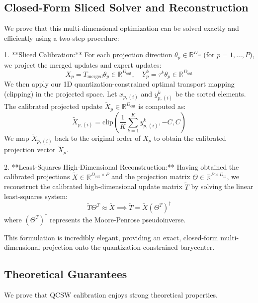 \documentclass{article}
\theoremstyle{plain}
\theoremstyle{definition}
\theoremstyle{remark}
\begin{document}
\subsection{Closed-Form Sliced Solver and Reconstruction}

We prove that this multi-dimensional optimization can be solved exactly and efficiently using a two-step procedure:

1. **Sliced Calibration:** For each projection direction $\theta_p \in \mathbb{R}^{D_{\text{in}}}$ (for $p = 1, \dots, P$), we project the merged updates and expert updates:
\begin{equation}
X_p = T_{\text{merged}} \theta_p \in \mathbb{R}^{D_{\text{out}}}, \quad Y^k_p = \tau^k \theta_p \in \mathbb{R}^{D_{\text{out}}}
\end{equation}
We then apply our 1D quantization-constrained optimal transport mapping (clipping) in the projected space. Let $x_{p, (i)}$ and $y^k_{p, (i)}$ be the sorted elements. The calibrated projected update $\tilde{X}_p \in \mathbb{R}^{D_{\text{out}}}$ is computed as:
\begin{equation}
\tilde{X}_{p, (i)} = \text{clip}\left( \frac{1}{K} \sum_{k=1}^K y^k_{p, (i)}, -C, C \right)
\end{equation}
We map $\tilde{X}_{p, (i)}$ back to the original order of $X_p$ to obtain the calibrated projection vector $\tilde{X}_p$.

2. **Least-Squares High-Dimensional Reconstruction:** Having obtained the calibrated projections $\tilde{X} \in \mathbb{R}^{D_{\text{out}} \times P}$ and the projection matrix $\Theta \in \mathbb{R}^{P \times D_{\text{in}}}$, we reconstruct the calibrated high-dimensional update matrix $\tilde{T}$ by solving the linear least-squares system:
\begin{equation}
\tilde{T} \Theta^T \approx \tilde{X} \implies \tilde{T} = \tilde{X} (\Theta^T)^\dagger
\end{equation}
where $(\Theta^T)^\dagger$ represents the Moore-Penrose pseudoinverse.

This formulation is incredibly elegant, providing an exact, closed-form multi-dimensional projection onto the quantization-constrained barycenter.

\subsection{Theoretical Guarantees}

We prove that QCSW calibration enjoys strong theoretical properties.
\end{document}
